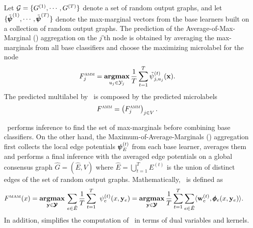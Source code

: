 {%
Let $\mathcal{G}=\{G^{(1)},\cdots,G^{(T)}\}$ denote a set of random output graphs, and let $\{\tilde{\pmb \psi}^{(1)},\cdots,\tilde{\pmb \psi}^{(T)}\}$ denote the max-marginal vectors from the base learners built on a collection of random output graphs.
The prediction of the Average-of-Max-Marginal (\amm) aggregation on the $j$'th node is obtained by averaging the max-marginals from all base classifiers and choose the maximizing microlabel for the node 
\begin{align*}
	F_j^{\text{{\sc amm}}}=\underset{u_j\in\mathcal{Y}_j}{\textbf{argmax}}\,\frac{1}{T}\sum_{t=1}^{T}\tilde{\psi}_{j,u_j}^{(t)}(\mathbf {x}).	\end{align*}
The predicted multilabel by \amm\ is composed by the predicted microlabels
\begin{align*}
	F^{\text{{\sc amm}}}=\left(F_j^{\text{{\sc amm}}}\right)_{j\in V}.
\end{align*}

\amm\ performs inference to find the set of max-marginals before combining base classifiers. 
On the other hand, the Maximum-of-Average-Marginals (\mam) aggregation first collects the local edge potentials $\pmb \psi_E^{(t)}$ from each base learner, averages them and performs a final inference with the averaged edge potentials on a global consensus graph $\hat{G}=(\hat{E},V)$ where $\hat{E}=\bigcup_{t=1}^{T}{E^{(t)}}$ is the union of distinct edges of the set of random output graphs.
Mathematically, \mam\ is defined as
\begin{align*}
	F^{\text{\tiny MAM}}(x) &= \underset{\vy \in \vYcal }{\argmax}\,\sum_{e\in \hat{E}}\frac{1}{T}\sum_{t=1}^{T}\ \psi^{(t)}_e(x,\vy_e)
	= \underset{\vy \in \vYcal}{\argmax}\, \frac{1}{T} \sum_{t=1}^T \sum_{e\in \hat{E}} \ip{\vw_e^{(t)}}{\phib_e(x,\vy_e)}. %
\end{align*}
In addition,  simplifies the computation of \mam\ in terms of dual variables and kernels.

}
